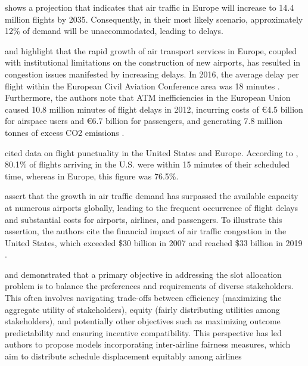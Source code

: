  shows a projection that indicates that air traffic in Europe will increase to 14.4 million flights by 2035. Consequently, in their most likely scenario, approximately 12\% of demand will be unaccommodated, leading to delays.

 and  highlight that the rapid growth of air transport services in Europe, coupled with institutional limitations on the construction of new airports, has resulted in congestion issues manifested by increasing delays. In 2016, the average delay per flight within the European Civil Aviation Conference area was 18 minutes \cite{Eurocontrol_AnnualReport2016}. Furthermore, the authors note that \acrfull{ATM} inefficiencies in the European Union caused 10.8 million minutes of flight delays in 2012, incurring costs of \euro{}4.5 billion for airspace users and \euro{}6.7 billion for passengers, and generating 7.8 million tonnes of excess CO2 emissions \cite{IATA_SESFactsheet2014a}.

 cited data on flight punctuality in the United States and Europe. According to , 80.1\% of flights arriving in the U.S. were within 15 minutes of their scheduled time, whereas in Europe, this figure was 76.5\%.

 assert that the growth in air traffic demand has surpassed the available capacity at numerous airports globally, leading to the frequent occurrence of flight delays and substantial costs for airports, airlines, and passengers. To illustrate this assertion, the authors cite the financial impact of air traffic congestion in the United States, which exceeded \$30 billion in 2007 \cite{gillen2016airport, jacquillat_interairline_2018, jacquillat_roadmap_2018, ribeiro_large-scale_2019} and reached \$33 billion in 2019 \cite{dixit_algorithmic_2023}.

 and  demonstrated that a primary objective in addressing the slot allocation problem is to balance the preferences and requirements of diverse stakeholders. This often involves navigating trade-offs between efficiency (maximizing the aggregate utility of stakeholders), equity (fairly distributing utilities among stakeholders), and potentially other objectives such as maximizing outcome predictability and ensuring incentive compatibility. This perspective has led authors to propose models incorporating inter-airline fairness measures, which aim to distribute schedule displacement equitably among airlines \cite{fairbrother2018development, jacquillat_roadmap_2018,  zografos_bi-objective_2019, jiang_decision_2021}

